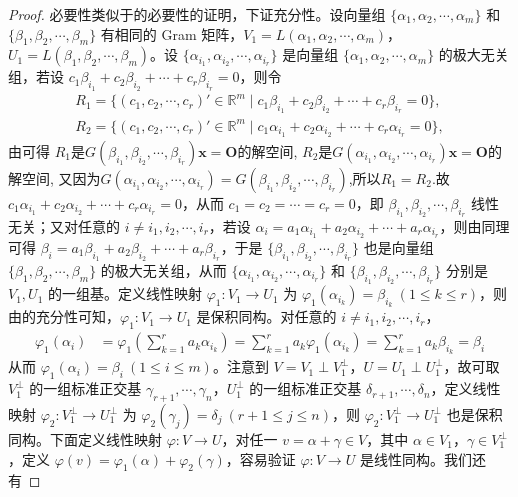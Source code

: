 \documentclass[../../main.tex]{subfiles}%
\begin{document}
\begin{proof}

必要性类似于的必要性的证明，下证充分性。设向量组 \(\{\alpha_1,\alpha_2,\cdots,\alpha_m\}\) 和 \(\{\beta_1,\beta_2,\cdots,\beta_m\}\) 有相同的 Gram 矩阵，\(V_1 = L(\alpha_1,\alpha_2,\cdots,\alpha_m)\)，\(U_1 = L(\beta_1,\beta_2,\cdots,\beta_m)\)。设 \(\{\alpha_{i_1},\alpha_{i_2},\cdots,\alpha_{i_r}\}\) 是向量组 \(\{\alpha_1,\alpha_2,\cdots,\alpha_m\}\) 的极大无关组，若设 \(c_1\beta_{i_1} + c_2\beta_{i_2} + \cdots + c_r\beta_{i_r} = 0\)，则令
\begin{align*}
R_1=\{(c_1,c_2,\cdots ,c_r)' \in \mathbb{R} ^m\mid c_1\beta _{i_1}+c_2\beta _{i_2}+\cdots +c_r\beta _{i_r}=0\},
\\
R_2=\{(c_1,c_2,\cdots ,c_r)' \in \mathbb{R} ^m\mid c_1\alpha _{i_1}+c_2\alpha _{i_2}+\cdots +c_r\alpha _{i_r}=0\},
\end{align*}
由可得 $R_1$是$G\left( \beta _{i_1},\beta _{i_2},\cdots ,\beta _{i_r} \right) \boldsymbol{x}=\boldsymbol{O}$的解空间,
$R_2$是$G\left( \alpha _{i_1},\alpha _{i_2},\cdots ,\alpha _{i_r} \right) \boldsymbol{x}=\boldsymbol{O}$的解空间,
又因为$G\left( \alpha _{i_1},\alpha _{i_2},\cdots ,\alpha _{i_r} \right) =G\left( \beta _{i_1},\beta _{i_2},\cdots ,\beta _{i_r} \right)$,所以$R_1=R_2$.故\(c_1\alpha_{i_1} + c_2\alpha_{i_2} + \cdots + c_r\alpha_{i_r} = 0\)，从而 \(c_1 = c_2 = \cdots = c_r = 0\)，即 \(\beta_{i_1},\beta_{i_2},\cdots,\beta_{i_r}\) 线性无关；又对任意的 \(i \neq i_1,i_2,\cdots,i_r\)，若设 \(\alpha_i = a_1\alpha_{i_1} + a_2\alpha_{i_2} + \cdots + a_r\alpha_{i_r}\)，则由同理可得 \(\beta_i = a_1\beta_{i_1} + a_2\beta_{i_2} + \cdots + a_r\beta_{i_r}\)，于是 \(\{\beta_{i_1},\beta_{i_2},\cdots,\beta_{i_r}\}\) 也是向量组 \(\{\beta_1,\beta_2,\cdots,\beta_m\}\) 的极大无关组，从而 \(\{\alpha_{i_1},\alpha_{i_2},\cdots,\alpha_{i_r}\}\) 和 \(\{\beta_{i_1},\beta_{i_2},\cdots,\beta_{i_r}\}\) 分别是 \(V_1,U_1\) 的一组基。定义线性映射 \(\varphi_1:V_1 \to U_1\) 为 \(\varphi_1(\alpha_{i_k}) = \beta_{i_k}\ (1\leqslant  k \leqslant  r)\)，则由的充分性可知，\(\varphi_1:V_1 \to U_1\) 是保积同构。对任意的 \(i \neq i_1,i_2,\cdots,i_r\)，
\begin{align*}
\varphi_1(\alpha_i) &= \varphi_1\left(\sum_{k = 1}^{r}a_k\alpha_{i_k}\right) = \sum_{k = 1}^{r}a_k\varphi_1(\alpha_{i_k}) = \sum_{k = 1}^{r}a_k\beta_{i_k} = \beta_i
\end{align*}
从而 \(\varphi_1(\alpha_i) = \beta_i\ (1\leqslant  i \leqslant  m)\)。注意到 \(V = V_1 \perp V_1^{\perp}\)，\(U = U_1 \perp U_1^{\perp}\)，故可取 \(V_1^{\perp}\) 的一组标准正交基 \(\gamma_{r + 1},\cdots,\gamma_n\)，\(U_1^{\perp}\) 的一组标准正交基 \(\delta_{r + 1},\cdots,\delta_n\)，定义线性映射 \(\varphi_2:V_1^{\perp} \to U_1^{\perp}\) 为 \(\varphi_2(\gamma_j) = \delta_j\ (r + 1\leqslant  j \leqslant  n)\)，则 \(\varphi_2:V_1^{\perp} \to U_1^{\perp}\) 也是保积同构。下面定义线性映射 \(\varphi:V \to U\)，对任一 \(v = \alpha + \gamma \in V\)，其中 \(\alpha \in V_1\)，\(\gamma \in V_1^{\perp}\)，定义 \(\varphi(v) = \varphi_1(\alpha) + \varphi_2(\gamma)\)，容易验证 \(\varphi:V \to U\) 是线性同构。我们还有

\end{proof}
\end{document}
